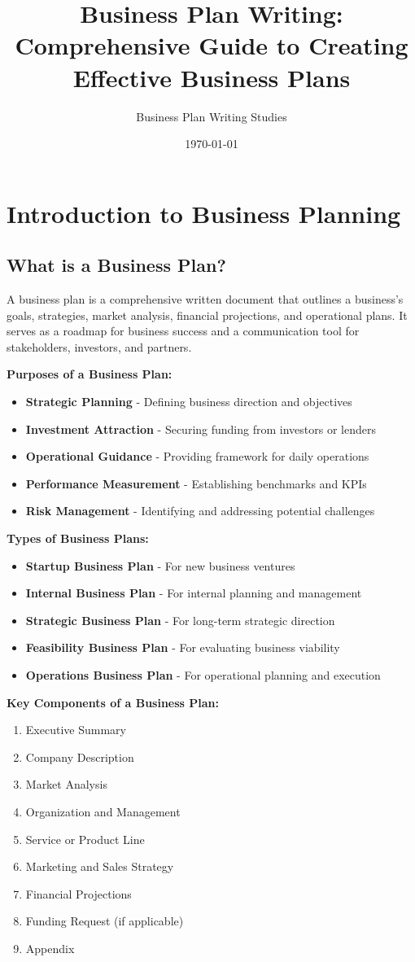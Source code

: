 \documentclass[12pt]{article}
\title{Business Plan Writing: Comprehensive Guide to Creating Effective Business Plans}
\author{Business Plan Writing Studies}
\date{\today}
\begin{document}
\maketitle

\section{Introduction to Business Planning}

\subsection{What is a Business Plan?}
A business plan is a comprehensive written document that outlines a business's goals, strategies, market analysis, financial projections, and operational plans. It serves as a roadmap for business success and a communication tool for stakeholders, investors, and partners.

\textbf{Purposes of a Business Plan:}
\begin{itemize}
    \item \textbf{Strategic Planning} - Defining business direction and objectives
    \item \textbf{Investment Attraction} - Securing funding from investors or lenders
    \item \textbf{Operational Guidance} - Providing framework for daily operations
    \item \textbf{Performance Measurement} - Establishing benchmarks and KPIs
    \item \textbf{Risk Management} - Identifying and addressing potential challenges
\end{itemize}

\textbf{Types of Business Plans:}
\begin{itemize}
    \item \textbf{Startup Business Plan} - For new business ventures
    \item \textbf{Internal Business Plan} - For internal planning and management
    \item \textbf{Strategic Business Plan} - For long-term strategic direction
    \item \textbf{Feasibility Business Plan} - For evaluating business viability
    \item \textbf{Operations Business Plan} - For operational planning and execution
\end{itemize}

\textbf{Key Components of a Business Plan:}
\begin{enumerate}
    \item Executive Summary
    \item Company Description
    \item Market Analysis
    \item Organization and Management
    \item Service or Product Line
    \item Marketing and Sales Strategy
    \item Financial Projections
    \item Funding Request (if applicable)
    \item Appendix
\end{enumerate}
\end{document}
